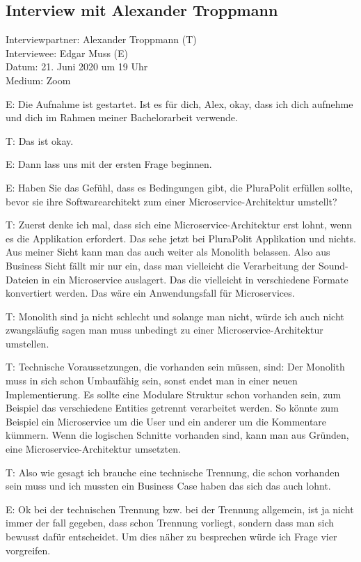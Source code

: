 \subsection{Interview mit Alexander Troppmann}
\label{appendix:troppmann}

Interviewpartner: Alexander Troppmann (T) \\
Interviewee: Edgar Muss (E) \\
Datum: 21. Juni 2020 um 19 Uhr \\
Medium: Zoom

E: Die Aufnahme ist gestartet. Ist es für dich, Alex, okay, dass ich dich aufnehme und dich im Rahmen meiner Bachelorarbeit verwende.

T: Das ist okay.

E: Dann lass uns mit der ersten Frage beginnen.

E: Haben Sie das Gefühl, dass es Bedingungen gibt, die PluraPolit erfüllen sollte, bevor sie ihre Softwarearchitekt zum einer Microservice-Architektur umstellt? 

T: Zuerst denke ich mal, dass sich eine Microservice-Architektur erst lohnt, wenn es die Applikation erfordert. Das sehe jetzt bei PluraPolit Applikation und nichts. Aus meiner Sicht kann man das auch weiter als Monolith belassen.  Also aus Business Sicht fällt mir nur ein,  dass man vielleicht die Verarbeitung der Sound-Dateien in ein Microservice auslagert. Das die vielleicht in verschiedene Formate konvertiert werden. Das wäre ein Anwendungsfall für Microservices. 

T: Monolith sind ja nicht schlecht und solange man nicht, würde ich auch nicht zwangsläufig sagen man muss unbedingt zu einer Microservice-Architektur umstellen.

T: Technische Voraussetzungen, die vorhanden sein müssen, sind: Der Monolith muss in sich schon Umbaufähig sein, sonst endet man in einer neuen Implementierung. Es sollte eine Modulare Struktur schon vorhanden sein, zum Beispiel das verschiedene Entities getrennt verarbeitet werden. So könnte zum Beispiel ein Microservice um die User und ein anderer um  die Kommentare kümmern. Wenn die logischen Schnitte vorhanden sind, kann man aus Gründen, eine Microservice-Architektur umsetzten. 

\label{appendix:t-1} \label{appendix:t-2}
T: Also wie gesagt ich brauche eine technische Trennung, die schon vorhanden sein muss und ich mussten ein Business Case haben das sich das auch lohnt.

E: Ok bei der technischen Trennung bzw. bei der Trennung allgemein, ist ja nicht immer der fall gegeben, dass schon Trennung vorliegt, sondern dass man sich bewusst dafür entscheidet. Um dies näher zu besprechen würde ich Frage vier vorgreifen.

